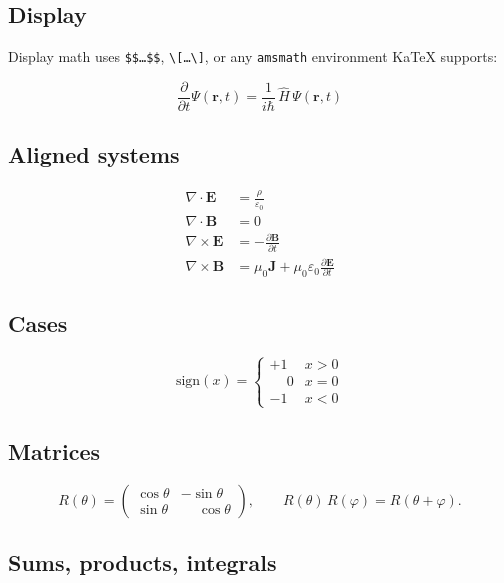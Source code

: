 \documentclass{article}
\begin{document}
\subsection{Display}

Display math uses \texttt{\$\$\dots\$\$},
\texttt{\textbackslash[\dots\textbackslash]}, or any \texttt{amsmath}
environment KaTeX supports:

\[
  \frac{\partial}{\partial t}\Psi(\mathbf{r}, t)
  = \frac{1}{i\hbar}\,\hat{H}\,\Psi(\mathbf{r}, t)
\]

\subsection{Aligned systems}

\begin{align}
  \nabla \cdot \mathbf{E}  &= \frac{\rho}{\varepsilon_0} \\
  \nabla \cdot \mathbf{B}  &= 0 \\
  \nabla \times \mathbf{E} &= -\frac{\partial \mathbf{B}}{\partial t} \\
  \nabla \times \mathbf{B} &= \mu_0 \mathbf{J}
                            + \mu_0\varepsilon_0\frac{\partial \mathbf{E}}{\partial t}
\end{align}

\subsection{Cases}

\[
  \mathrm{sign}(x) = \begin{cases}
    +1 & x > 0 \\
    \phantom{+}0 & x = 0 \\
    -1 & x < 0
  \end{cases}
\]

\subsection{Matrices}

\[
  R(\theta) =
  \begin{pmatrix}
    \cos\theta & -\sin\theta \\
    \sin\theta & \phantom{-}\cos\theta
  \end{pmatrix},
  \qquad
  R(\theta)\,R(\varphi) = R(\theta + \varphi).
\]

\subsection{Sums, products, integrals}
\end{document}
